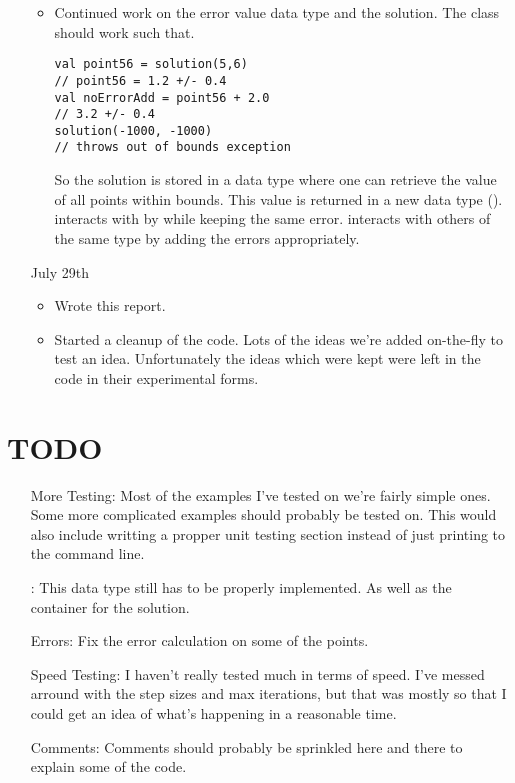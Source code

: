 \documentclass[12pt]{article}
\begin{document}
\begin{itemize}
\begin{itemize}
    \item Continued work on the error value data type and the solution. The class
        should work such that.
\begin{verbatim}
val point56 = solution(5,6)
// point56 = 1.2 +/- 0.4
val noErrorAdd = point56 + 2.0
// 3.2 +/- 0.4
solution(-1000, -1000)
// throws out of bounds exception
\end{verbatim}
        So the solution is stored in a data type where one can
        retrieve the value of all points within bounds. This value is
        returned in a new data type (). 
        interacts with  by while keeping the same
        error.  interacts with others of the same type
        by adding the errors appropriately.
        
    \end{itemize}

\item[July 29th]\begin{itemize}

    \item Wrote this report.
    \item Started a cleanup of the code. Lots of the ideas we're added
        on-the-fly to test an idea. Unfortunately the ideas which
        were kept were left in the code in their experimental forms. 
    \end{itemize}
    
\end{itemize}
\section{TODO}
\begin{itemize}

\item[More Testing:] Most of the examples I've tested on we're fairly
    simple ones. Some more complicated examples should probably be
    tested on. This would also include writting a propper unit testing
    section instead of just printing to the command line.

\item[\code{errorVal}:] This data type still has to be properly
    implemented. As well as the container for the solution.
    
\item[Errors:] Fix the error calculation on some of the points. 

\item[Speed Testing:] I haven't really tested much in terms of
    speed. I've messed arround with the step sizes and max iterations,
    but that was mostly so that I could get an idea of what's
    happening in a reasonable time.

\item[Comments:] Comments should probably be sprinkled here and there
    to explain some of the code. 
\end{itemize}
\end{document}
